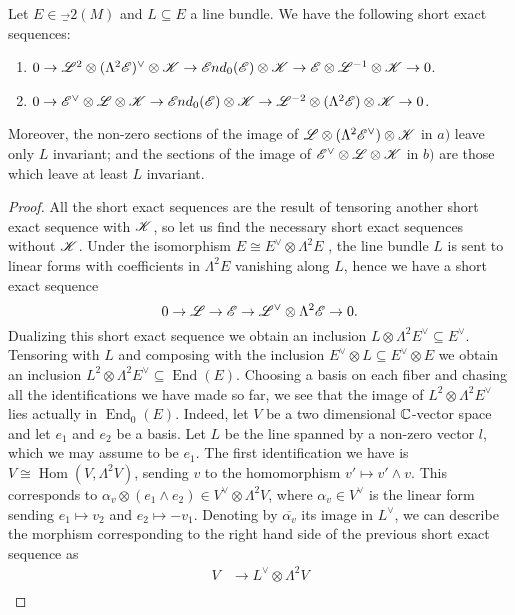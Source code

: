 \documentclass[A4paper, 12pt, british, reqno]{amsart}
\DeclareMathOperator{\Hom}{Hom}
\DeclareMathOperator{\End}{End}
\newcommand{\ot}{\otimes}
\newcommand{\dual}{^{\vee}}
\newcommand{\1}{\mathbbm{1}}
\begin{document}
\begin{lm}\label{lm:linearalgebra}
    Let $E\in \Vec_{2}(M)$ and $L\subseteq E$ a line bundle.
    We have the following short exact sequences:
    \begin{enumerate}[label=\alph*)]
	\item $0\to \L^{2}\ot (\Lambda^{2}\E)\dual \ot \sK \to \sEnd_{0}(\E)\ot \sK\to \E\ot \L^{-1}\ot \sK\to 0$.
	\item $0\to \E\dual \ot \L\ot \sK\to \sEnd_{0}(\E)\ot \sK \to \L^{-2}\ot (\Lambda^{2}\E)\ot \sK\to 0$.
    \end{enumerate}
    Moreover, the non-zero sections of the image of $\L\ot (\Lambda^{2}\E\dual)\ot \sK$ in $a)$ leave only $L$ invariant; and the sections of the image of $\E\dual\ot \L\ot \sK$ in $b)$ are those which leave at least $L$ invariant.
    \color{gray}
    \begin{proof}
	All the short exact sequences are the result of tensoring another short exact sequence with $\mathscr{K}$, so let us find the necessary short exact sequences without $\mathscr{K}$.
	Under the isomorphism $E\cong E\dual \ot \Lambda^{2}E$ \cite[Exercise II.5.16]{har77}, the line bundle $L$ is sent to linear forms with coefficients in $\Lambda^{2}E$ vanishing along $L$, hence we have a short exact sequence
	\[ 0\to \L\to \E\to \L\dual \ot \Lambda^{2}\E\to 0. \]
	Dualizing this short exact sequence we obtain an inclusion $L\ot \Lambda^{2}E\dual \subseteq E\dual$.
	Tensoring with $L$ and composing with the inclusion $E\dual\ot L\subseteq E\dual \ot E$ we obtain an inclusion $L^{2}\ot \Lambda^{2}E\dual \subseteq \End(E)$.
	Choosing a basis on each fiber and chasing all the identifications we have made so far, we see that the image of $L^{2}\ot \Lambda^{2}E\dual$ lies actually in $\End_{0}(E)$.
	Indeed, let $V$ be a two dimensional $\mathbb{C}$-vector space and let $e_{1}$ and $e_{2}$ be a basis.
	Let $L$ be the line spanned by a non-zero vector $l$, which we may assume to be $e_{1}$.
	The first identification we have is $V\cong \Hom(V,\Lambda^{2}V)$, sending $v$ to the homomorphism $v'\mapsto v'\wedge v$.
	This corresponds to $\alpha_{v}\ot (e_{1}\wedge e_{2})\in V\dual\ot\Lambda^{2}V$, where $\alpha_{v}\in V\dual$ is the linear form sending $e_{1}\mapsto v_{2}$ and $e_{2}\mapsto -v_{1}$.
	Denoting by $\overline{\alpha_{v}}$ its image in $L\dual$, we can describe the morphism corresponding to the right hand side of the previous short exact sequence as
	\begin{align*}
	    V &\longrightarrow L\dual \ot \Lambda^{2}V \\

\end{align*}
\end{proof}
\end{lm}
\end{document}

